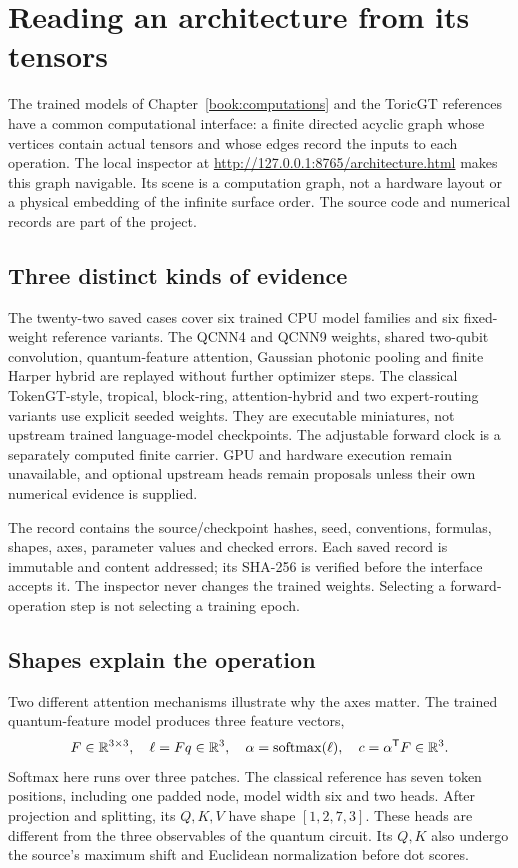 \chapter{Reading an architecture from its tensors}
\label{book:architecture}
The trained models of Chapter~\ref{book:computations} and the ToricGT
references have a common computational interface: a finite directed acyclic
graph whose vertices contain actual tensors and whose edges record the
inputs to each operation. The local inspector at
\url{http://127.0.0.1:8765/architecture.html} makes this graph navigable.
Its scene is a computation graph, not a hardware layout or a physical
embedding of the infinite surface order. The source code and numerical
records are part of the project.

\section{Three distinct kinds of evidence}
The twenty-two saved cases cover six trained CPU model families and six
fixed-weight reference variants. The QCNN4 and QCNN9 weights, shared
two-qubit convolution, quantum-feature attention, Gaussian photonic pooling
and finite Harper hybrid are replayed without further optimizer steps.
The classical TokenGT-style, tropical, block-ring, attention-hybrid and two
expert-routing variants use explicit seeded weights. They are executable
miniatures, not upstream trained language-model checkpoints. The adjustable
forward clock is a separately computed finite carrier. GPU and hardware
execution remain unavailable, and optional upstream heads remain proposals
unless their own numerical evidence is supplied.

The record contains the source/checkpoint hashes, seed, conventions,
formulas, shapes, axes, parameter values and checked errors. Each saved
record is immutable and content addressed; its SHA-256 is verified before
the interface accepts it. The inspector never changes the trained weights.
Selecting a forward-operation step is not selecting a training epoch.

\section{Shapes explain the operation}
Two different attention mechanisms illustrate why the axes matter.
The trained quantum-feature model produces three feature vectors,
\[
 F\in\mathbb R^{3\times3},\quad \ell=Fq\in\mathbb R^3,\quad
 \alpha=\operatorname{softmax}(\ell),\quad c=\alpha^{\mathsf{T}}F\in\mathbb R^3.
\]
Softmax here runs over three patches. The classical reference has seven
token positions, including one padded node, model width six and two heads.
After projection and splitting, its $Q,K,V$ have shape
$[1,2,7,3]$. These heads are different from the three observables of the
quantum circuit. Its $Q,K$ also undergo the source's maximum shift and
Euclidean normalization before dot scores.

